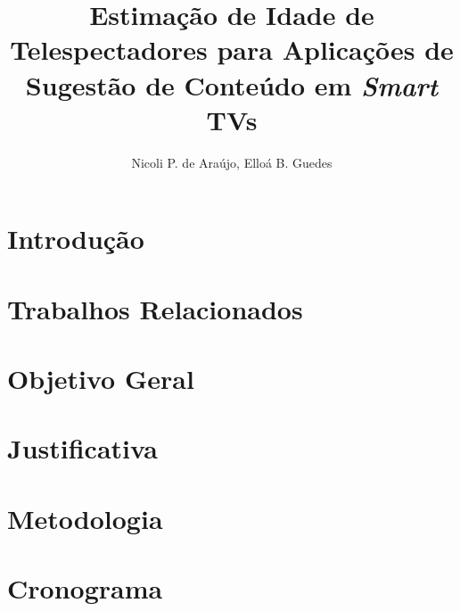 \documentclass[12pt]{article}
\title{Estimação de Idade de Telespectadores para Aplicações de Sugestão de Conteúdo em \emph{Smart} TVs}
\author{Nicoli P. de Araújo, Elloá B. Guedes}
\begin{document}

\maketitle



\section{Introdução}\label{sec:intro}


\section{Trabalhos Relacionados}\label{sec:trab_relac}


\section{Objetivo Geral}\label{sec:objetivo}


\section{Justificativa}\label{sec:justificativa}


\section{Metodologia}\label{sec:metodo}


\section{Cronograma}\label{sec:crono}



\end{document}
